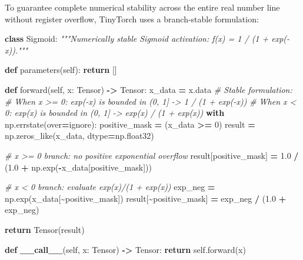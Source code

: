 \documentclass[
  letterpaper,
]{scrbook}
\newenvironment{Shaded}{\begin{snugshade}}{\end{snugshade}}
\newcommand{\CommentTok}[1]{\textcolor[rgb]{0.56,0.35,0.01}{\textit{#1}}}
\newcommand{\ControlFlowTok}[1]{\textcolor[rgb]{0.13,0.29,0.53}{\textbf{#1}}}
\newcommand{\DecValTok}[1]{\textcolor[rgb]{0.00,0.00,0.81}{#1}}
\newcommand{\FloatTok}[1]{\textcolor[rgb]{0.00,0.00,0.81}{#1}}
\newcommand{\FunctionTok}[1]{\textcolor[rgb]{0.13,0.29,0.53}{\textbf{#1}}}
\newcommand{\KeywordTok}[1]{\textcolor[rgb]{0.13,0.29,0.53}{\textbf{#1}}}
\newcommand{\NormalTok}[1]{#1}
\newcommand{\OperatorTok}[1]{\textcolor[rgb]{0.81,0.36,0.00}{\textbf{#1}}}
\newcommand{\StringTok}[1]{\textcolor[rgb]{0.31,0.60,0.02}{#1}}
\newcommand{\VariableTok}[1]{\textcolor[rgb]{0.00,0.00,0.00}{#1}}
\begin{document}
To guarantee complete numerical stability across the entire real number
line without register overflow, TinyTorch uses a branch-stable
formulation:

\begin{Shaded}
\begin{Highlighting}[]
\KeywordTok{class}\NormalTok{ Sigmoid:}
    \CommentTok{"""Numerically stable Sigmoid activation: f(x) = 1 / (1 + exp({-}x))."""}

    \KeywordTok{def}\NormalTok{ parameters(}\VariableTok{self}\NormalTok{):}
        \ControlFlowTok{return}\NormalTok{ []}

    \KeywordTok{def}\NormalTok{ forward(}\VariableTok{self}\NormalTok{, x: Tensor) }\OperatorTok{{-}\textgreater{}}\NormalTok{ Tensor:}
\NormalTok{        x\_data }\OperatorTok{=}\NormalTok{ x.data}
        \CommentTok{\# Stable formulation:}
        \CommentTok{\# When x \textgreater{}= 0: exp({-}x) is bounded in (0, 1] {-}\textgreater{} 1 / (1 + exp({-}x))}
        \CommentTok{\# When x \textless{} 0: exp(x) is bounded in (0, 1] {-}\textgreater{} exp(x) / (1 + exp(x))}
        \ControlFlowTok{with}\NormalTok{ np.errstate(over}\OperatorTok{=}\StringTok{\textquotesingle{}ignore\textquotesingle{}}\NormalTok{):}
\NormalTok{            positive\_mask }\OperatorTok{=}\NormalTok{ (x\_data }\OperatorTok{\textgreater{}=} \DecValTok{0}\NormalTok{)}
\NormalTok{            result }\OperatorTok{=}\NormalTok{ np.zeros\_like(x\_data, dtype}\OperatorTok{=}\NormalTok{np.float32)}

            \CommentTok{\# x \textgreater{}= 0 branch: no positive exponential overflow}
\NormalTok{            result[positive\_mask] }\OperatorTok{=} \FloatTok{1.0} \OperatorTok{/}\NormalTok{ (}\FloatTok{1.0} \OperatorTok{+}\NormalTok{ np.exp(}\OperatorTok{{-}}\NormalTok{x\_data[positive\_mask]))}

            \CommentTok{\# x \textless{} 0 branch: evaluate exp(x)/(1 + exp(x))}
\NormalTok{            exp\_neg }\OperatorTok{=}\NormalTok{ np.exp(x\_data[}\OperatorTok{\textasciitilde{}}\NormalTok{positive\_mask])}
\NormalTok{            result[}\OperatorTok{\textasciitilde{}}\NormalTok{positive\_mask] }\OperatorTok{=}\NormalTok{ exp\_neg }\OperatorTok{/}\NormalTok{ (}\FloatTok{1.0} \OperatorTok{+}\NormalTok{ exp\_neg)}

        \ControlFlowTok{return}\NormalTok{ Tensor(result)}

    \KeywordTok{def} \FunctionTok{\_\_call\_\_}\NormalTok{(}\VariableTok{self}\NormalTok{, x: Tensor) }\OperatorTok{{-}\textgreater{}}\NormalTok{ Tensor:}
        \ControlFlowTok{return} \VariableTok{self}\NormalTok{.forward(x)}
\end{Highlighting}
\end{Shaded}
\end{document}
